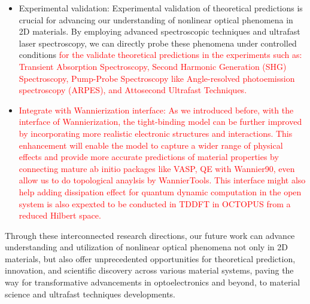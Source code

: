 \begin{itemize}
	\item Experimental validation: Experimental validation of theoretical predictions is crucial for advancing our understanding of nonlinear optical phenomena in 2D materials. By employing advanced spectroscopic techniques and ultrafast laser spectroscopy, we can directly probe these phenomena under controlled conditions \textcolor{red}{for the validate theoretical predictions in the experiments such as: Transient Absorption Spectroscopy, Second Harmonic Generation (SHG) Spectroscopy, Pump-Probe Spectroscopy like Angle-resolved photoemission spectroscopy (ARPES), and Attosecond Ultrafast Techniques.}

	\item \textcolor{red}{Integrate with Wannierization interface: As we introduced before, with the interface of Wannierization, the tight-binding model can be further improved by incorporating more realistic electronic structures and interactions. This enhancement will enable the model to capture a wider range of physical effects and provide more accurate predictions of material properties by connecting mature ab initio packages like VASP, QE with Wannier90, even allow us to do topological anaylsis by WannierTools. This interface might also help adding dissipation effect for quantum dynamic computation in the open system is also expexted to be conducted in \gls{TDDFT} in OCTOPUS from a reduced Hilbert space.}

\end{itemize}
Through these interconnected research directions, our future work can advance understanding and utilization of nonlinear optical phenomena not only in 2D materials, but also offer unprecedented opportunities for theoretical prediction, innovation, and scientific discovery across various material systems, paving the way for transformative advancements in optoelectronics and beyond, to material science and ultrafast techniques developments.
